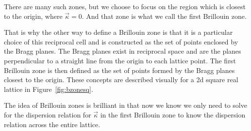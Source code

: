 There are many such zones, but we choose to focus on the region which is
closest to the origin, where $\vec{\kappa}=0$. And that zone is what we call
the first Brillouin zone. 

That is why the other way to define a Brillouin zone is that it is a particular
choice of this reciprocal cell and is constructed as the set of points enclosed
by the Bragg planes. The Bragg planes exist in reciprocal space and are the
planes perpendicular to a straight line from the origin to each lattice point.
The first Brillouin zone is then defined as the set of points formed by the
Bragg planes closest to the origin. These concepts are described visually for a
2d square real lattice in Figure~\ref{fig:bzonesq}.

The idea of Brillouin zones is brilliant in that now we know we only need to
solve for the dispersion relation for $\vec{\kappa}$ in the first Brillouin
zone to know the dispersion relation across the entire lattice.
